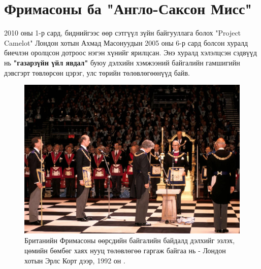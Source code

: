 \documentclass[10pt,twocolumn,letterpaper]{article}
\begin{document}
\section{Фримасоны ба "Англо-Саксон Мисс"}
2010 оны 1-р сард, биднийгээс өөр сэтгүүл зүйн байгууллага болох "Project Camelot" Лондон хотын Ахмад Масонуудын 2005 оны 6-р сард болсон хуралд биечлэн оролцсон дотроос нэгэн хүнийг \cite{4,6} ярилцсан. Энэ хуралд хэлэлцсэн сэдвүүд нь \textbf{"газарзүйн үйл явдал"} буюу дэлхийн хэмжээний байгалийн гамшигийн дэвсгэрт төвлөрсөн цэрэг, улс төрийн төлөвлөгөөнүүд байв.

\begin{figure}[b]
\begin{center}
\includegraphics[width=1\linewidth]{freemason.jpg}
\end{center}
   \caption{Британийн Фримасоны өөрсдийн байгалийн байдалд дэлхийг эзлэх, цөмийн бөмбөг хаях нууц төлөвлөгөө гаргаж байгаа нь - Лондон хотын Эрлс Корт дээр, 1992 он \cite{5}.}
\label{fig:1}
\label{fig:onecol}
\end{figure}
\end{document}
